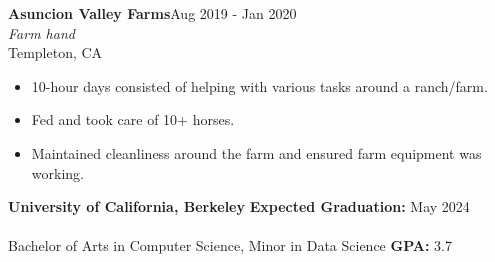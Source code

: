 \documentclass[11pt]{article}
\begin{document}
\begin{adjustwidth}{1em}{1em}
    \vspace{5mm}

    \textbf{Asuncion Valley Farms}\hfill Aug 2019 - Jan 2020
    \\ \textit{Farm hand} 
    \\Templeton, CA
    \begin{itemize}
        \item 10-hour days consisted of helping with various tasks around a ranch/farm.
        \item Fed and took care of 10+ horses.
        \item Maintained cleanliness around the farm and ensured farm equipment was working.
    \end{itemize}
        
    \end{adjustwidth}

    

        \begin{adjustwidth}{1em}{1em}

            \textbf{University of California, Berkeley} 
            \hfill 
            \textbf{Expected Graduation:} May 2024 \\\\
            Bachelor of Arts in Computer Science, Minor in Data Science \hfill  \textbf{GPA:} 3.7

            \vspace{2.5mm}

        \end{adjustwidth}

    
\end{document}
